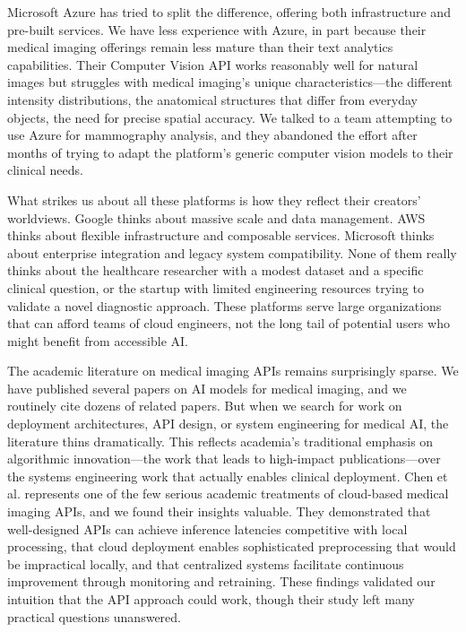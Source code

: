 \documentclass[12pt,a4paper]{article}
\begin{document}
Microsoft Azure has tried to split the difference, offering both infrastructure and pre-built services. We have less experience with Azure, in part because their medical imaging offerings remain less mature than their text analytics capabilities. Their Computer Vision API works reasonably well for natural images but struggles with medical imaging's unique characteristics—the different intensity distributions, the anatomical structures that differ from everyday objects, the need for precise spatial accuracy. We talked to a team attempting to use Azure for mammography analysis, and they abandoned the effort after months of trying to adapt the platform's generic computer vision models to their clinical needs.

What strikes us about all these platforms is how they reflect their creators' worldviews. Google thinks about massive scale and data management. AWS thinks about flexible infrastructure and composable services. Microsoft thinks about enterprise integration and legacy system compatibility. None of them really thinks about the healthcare researcher with a modest dataset and a specific clinical question, or the startup with limited engineering resources trying to validate a novel diagnostic approach. These platforms serve large organizations that can afford teams of cloud engineers, not the long tail of potential users who might benefit from accessible AI.

The academic literature on medical imaging APIs remains surprisingly sparse. We have published several papers on AI models for medical imaging, and we routinely cite dozens of related papers. But when we search for work on deployment architectures, API design, or system engineering for medical AI, the literature thins dramatically. This reflects academia's traditional emphasis on algorithmic innovation—the work that leads to high-impact publications—over the systems engineering work that actually enables clinical deployment. Chen et al. \cite{chen2021lowdose} represents one of the few serious academic treatments of cloud-based medical imaging APIs, and we found their insights valuable. They demonstrated that well-designed APIs can achieve inference latencies competitive with local processing, that cloud deployment enables sophisticated preprocessing that would be impractical locally, and that centralized systems facilitate continuous improvement through monitoring and retraining. These findings validated our intuition that the API approach could work, though their study left many practical questions unanswered.
\end{document}
